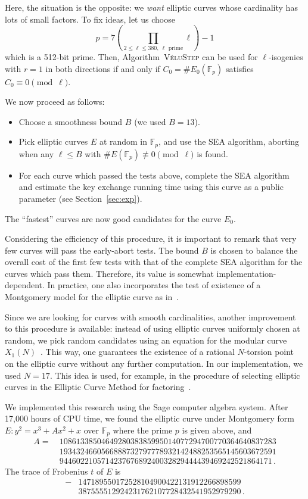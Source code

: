\documentclass{article}
\newcommand{\F}{\mathbb{F}}
\newcommand{\algstyle}[1]{\textsc{#1}}
\theoremstyle{definition}
\begin{document}
Here, the situation is the opposite: we \emph{want} elliptic curves
whose cardinality has lots of small factors. To fix ideas, let us choose
\[
p = 7 \left(\prod_{2\leq\ell\leq 380,\ \ell \text{ prime}} \ell\right) - 1
\]
which is a 512-bit prime. Then, Algorithm~\algstyle{VéluStep} can be used
for $\ell$-isogenies with $r=1$ in both directions if and only if
$C_0 = \# E_0(\F_p)$ satisfies $C_0 \equiv0\pmod{\ell}$.

We now proceed as follows:
\begin{itemize}
\item Choose a smoothness bound $B$ (we used $B = 13$).
\item Pick elliptic curves $E$ at random in $\F_p$, and use the SEA algorithm,
aborting when any $\ell\leq B$ 
with $\#E(\F_p) \not\equiv 0\pmod{\ell}$ is found.
\item For each curve which passed the tests above, complete the SEA
algorithm and estimate the key exchange running time using this
curve as a public parameter (see Section~\ref{sec:exp}).
\end{itemize}
The ``fastest'' curves are now good candidates for the curve $E_0$.

Considering the efficiency of this procedure, it is important to remark
that very few curves will pass the early-abort tests. The bound $B$ is
chosen to balance the overall cost of the first few tests with that of
the complete SEA algorithm for the curves which pass them. Therefore,
its value is somewhat implementation-dependent. In practice, one also
incorporates the test of existence of a Montgomery model for the
elliptic curve as in~\cite{todo:refMontgomery}.

Since we are looking for curves with smooth cardinalities, another
improvement to this procedure is available: instead of using elliptic
curves uniformly chosen at random, we pick random candidates using
an equation for the modular curve $X_1(N)$~\cite{sutherland2012constructing}.
This way, one guarantees the existence of a rational $N$-torsion point
on the elliptic curve without any further computation. In our
implementation, we used $N = 17$. This idea is used, for example,
in the procedure of selecting elliptic curves in the Elliptic Curve Method
for factoring~\cite{todo:refECM}.

We implemented this research using the Sage computer algebra system.
After 17,000 hours of CPU time, we found the elliptic curve under
Montgomery form %
$
	E : y^2 = x^3 + A x^2 + x
$
over $\F_p$ where the prime $p$ is given above, and
\[
\begin{aligned}
A =\ 
& 1086133850464928038385995014077294700770364640837283 \\
& 1934324660566888732797778932142488253565145603672591 \\
& 944602210571423767689240032829444439469242521864171\,.
\end{aligned}
\]
The trace of Frobenius $t$ of $E$ is
\[
\begin{aligned}
-&147189550172528104900422131912266898599 \\
&387555512924231762107728432541952979290\,.
\end{aligned}
\]
\end{document}
